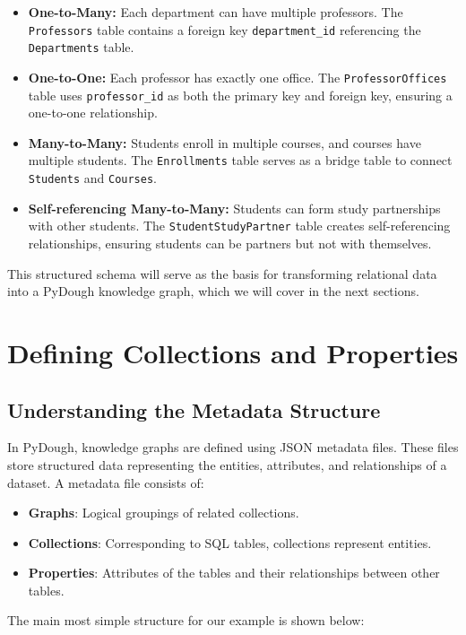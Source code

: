 \documentclass{article}
\begin{document}
\begin{itemize}
    \item \textbf{One-to-Many:} Each department can have multiple professors. The \texttt{Professors} table contains a foreign key \texttt{department\_id} referencing the \texttt{Departments} table.
    \item \textbf{One-to-One:} Each professor has exactly one office. The \texttt{ProfessorOffices} table uses \texttt{professor\_id} as both the primary key and foreign key, ensuring a one-to-one relationship.
    \item \textbf{Many-to-Many:} Students enroll in multiple courses, and courses have multiple students. The \texttt{Enrollments} table serves as a bridge table to connect \texttt{Students} and \texttt{Courses}.
    \item \textbf{Self-referencing Many-to-Many:} Students can form study partnerships with other students. The \texttt{StudentStudyPartner} table creates self-referencing relationships, ensuring students can be partners but not with themselves.
\end{itemize}

This structured schema will serve as the basis for transforming relational data into a PyDough knowledge graph, which we will cover in the next sections.

\section{Defining Collections and Properties}

\subsection{Understanding the Metadata Structure}
In PyDough, knowledge graphs are defined using JSON metadata files. These files store structured data representing the entities, attributes, and relationships of a dataset. A metadata file consists of:
\begin{itemize}
    \item \textbf{Graphs}: Logical groupings of related collections.
    \item \textbf{Collections}: Corresponding to SQL tables, collections represent entities.
    \item \textbf{Properties}: Attributes of the tables and their relationships between other tables.
\end{itemize}

The main most simple structure for our example is shown below:
\end{document}
